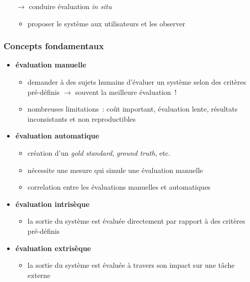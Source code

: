 \begin{frame}[allowframebreaks]
\begin{itemize}
    \item[$\to$] conduire évaluation \textit{in situ}
    \begin{itemize}
        \item proposer le système aux utilisateurs et les observer
    \end{itemize}

\end{itemize}

\end{frame}

\begin{frame}[allowframebreaks]
\frametitle{Concepts fondamentaux}

\begin{itemize} \itemsep0.8em
    \item \textbf{évaluation manuelle}
    \begin{itemize}
        \item demander à des sujets humains d'évaluer un système selon des 
              critères pré-définis $\to$ souvent la meilleure évaluation~!
        \item nombreuses limitations~: coût important, évaluation lente, 
              résultats inconsistants et non reproductibles
    \end{itemize}

    \item \textbf{évaluation automatique}
    \begin{itemize}
        \item création d'un \textit{gold standard}, \textit{ground truth}, etc.
        \item nécessite une mesure qui \og{}simule\fg{} une évaluation manuelle
        \item correlation entre les évaluations manuelles et automatiques
    \end{itemize}

    \framebreak

    \item \textbf{évaluation intrisèque}
    \begin{itemize}
        \item la sortie du système est évaluée directement par rapport à des 
              critères pré-définis
    \end{itemize}

    \item \textbf{évaluation extrisèque}
    \begin{itemize}
        \item la sortie du système est évaluée à travers son impact sur une 
              tâche externe
    \end{itemize}


\end{itemize}
\end{frame}
